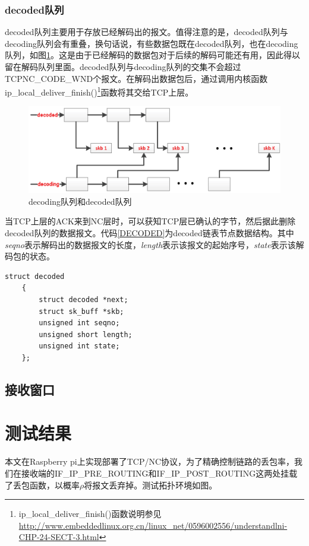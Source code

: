 \subsubsection{\textbf{decoded队列}}
decoded队列主要用于存放已经解码出的报文。值得注意的是，decoded队列与decoding队列会有重叠，换句话说，有些数据包既在decoded队列，也在decoding队列，如图\ref{DECODED_EPS}。这是由于已经解码的数据包对于后续的解码可能还有用，因此得以留在解码队列里面。decoded队列与decoding队列的交集不会超过TCPNC\_CODE\_WND个报文。在解码出数据包后，通过调用内核函数ip\_local\_deliver\_finish()\footnote{ip\_local\_deliver\_finish()函数说明参见\url{http://www.embeddedlinux.org.cn/linux_net/0596002556/understandlni-CHP-24-SECT-3.html}}函数将其交给TCP上层。
\begin{figure}[htbp]
	\centering
	\includegraphics[width=5in]{figures/decoded.eps}
	\caption{decoding队列和decoded队列}
	\label{DECODED_EPS}
\end{figure}
当TCP上层的ACK来到NC层时，可以获知TCP层已确认的字节，然后据此删除decoded队列的数据报文。代码\ref{DECODED}为decoded链表节点数据结构。其中\emph{seqno}表示解码出的数据报文的长度，\emph{length}表示该报文的起始序号，\emph{state}表示该解码包的状态。
	\begin{lstlisting}[float,caption=decoded链表节点数据结构,label={DECODED},language={[ANSI]C}]
	struct decoded
	{
		struct decoded *next;
		struct sk_buff *skb;
		unsigned int seqno;
		unsigned short length;
		unsigned int state;
	};
	\end{lstlisting}
\subsection{接收窗口}
\section{测试结果}
本文在Raspberry pi上实现部署了TCP/NC协议，为了精确控制链路的丢包率，我们在接收端的IF\_IP\_PRE\_ROUTING和IF\_IP\_POST\_ROUTING这两处挂载了丢包函数，以概率$\rho$将报文丢弃掉。测试拓扑环境如图。


